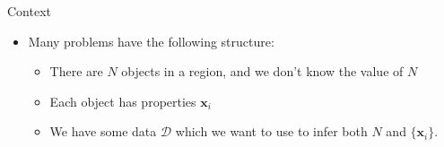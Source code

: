 
\begin{frame}[t,plain]
\titlepage
\end{frame}

\begin{frame}[t]{Context}
\begin{itemize}
\item Many problems have the following structure:
  \begin{itemize}
  \item There are $N$ objects in a region, and we don't know the value of $N$
  \item Each object has properties $\mathbf{x}_i$
  \item We have some data $\mathcal{D}$ which we want to use to infer both $N$
        and $\{\mathbf{x}_i\}$.
  \end{itemize}
\end{itemize}
\end{frame}

